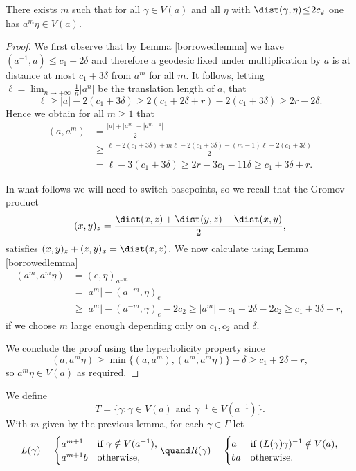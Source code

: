 \begin{lemma}\label{mlemma}
There exists \(m\) such that for all \(\gamma \!\in\! V(a)\) and all \(\eta\) with \(\dist(\gamma,\eta) \!\le\! 2c_2\) one has \(a^m\eta \in V(a)\).
\end{lemma}
\begin{proof}
We first observe that by Lemma \ref{borrowedlemma} we have \((a^{-1},a) \le c_1 + 2\delta\) and therefore a geodesic fixed under multiplication by \(a\) is at distance at most \(c_1+3\delta\) from \(a^m\) for all \(m\).
It follows, letting \(\ell = \lim_{n \to +\infty}\frac{1}{n}|a^n|\) be the translation length of \(a\), that
\[
\ell \ge |a| - 2(c_1+3\delta) \ge 2(c_1+2\delta+r) -2(c_1+3\delta) \ge 2r-2\delta.
\]
Hence we obtain for all \(m \ge 1\) that
\begin{align*}
(a,a^m) &= \frac{|a|+|a^m|-|a^{m-1}|}{2}
\\ &\ge \frac{\ell -2(c_1+3\delta) + m\ell - 2(c_1+3\delta) - (m-1)\ell -2(c_1+3\delta)}{2}
\\ &= \ell - 3(c_1+3\delta)
\ge 2r - 3c_1-11\delta
\ge c_1+3\delta + r.
\end{align*}

In what follows we will need to switch basepoints, so we recall that the Gromov product
\[
(x,y)_z = \frac{\dist(x,z)+\dist(y,z)-\dist(x,y)}{2},
\]
satisfies
\((x,y)_z + (z,y)_x = \dist(x,z)\).
We now calculate using Lemma \ref{borrowedlemma}
\begin{align*}
(a^m,a^{m}\eta) &= (e,\eta)_{a^{-m}}
\\ &= |a^m| - (a^{-m},\eta)_{e}
\\ &\ge |a^m| - (a^{-m},\gamma)_{e} - 2c_2
\ge |a^m| - c_1 - 2\delta - 2c_2
\ge c_1+3\delta + r,
\end{align*}
if we choose \(m\) large enough depending only on \(c_1,c_2\) and \(\delta\).

We conclude the proof using the hyperbolicity property since
\[
(a,a^m\eta) \ge \min\lbrace (a,a^m), (a^m,a^m\eta) \rbrace -\delta \ge c_1 + 2\delta + r,
\]
so \(a^m\eta \in V(a)\) as required.
\end{proof}

We define
\[
T = \lbrace \gamma: \gamma \in V(a)\text{ and }\gamma^{-1} \in V(a^{-1})\rbrace.
\]
With \(m\) given by the previous lemma, for each \(\gamma \in \Gamma\) let
\[
L(\gamma) =\begin{cases}a^{m+1} &\text{if } \gamma \notin V(a^{-1}),\\ a^{m+1}b &\text{otherwise,}\end{cases}\quand
R(\gamma) =\begin{cases}a &\text{if } (L(\gamma)\gamma)^{-1} \notin V(a),\\ ba &\text{otherwise.}\end{cases}
\]

